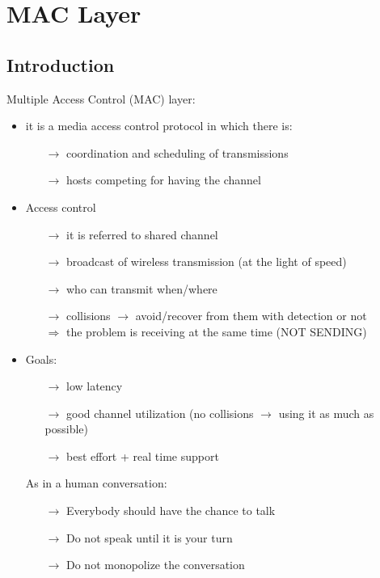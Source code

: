 \section{MAC Layer}

\subsection{Introduction}
Multiple Access Control (MAC) layer:
\begin{itemize}
    \item it is a media access control protocol in which there is:
    \begin{itemize}
        \item[$\rightarrow$] coordination and scheduling of transmissions
        \item[$\rightarrow$] hosts competing for having the channel
    \end{itemize}
    \item Access control
    \begin{itemize}
        \item[$\rightarrow$] it is referred to shared channel
        \item[$\rightarrow$] broadcast of wireless transmission (at the light of speed)
        \item[$\rightarrow$] who can transmit when/where
        \item[$\rightarrow$] collisions $\rightarrow$ avoid/recover from them with detection or not\\
        $\Rightarrow$ the problem is receiving at the same time (NOT SENDING)
    \end{itemize}
    \item Goals:
    \begin{itemize}
        \item[$\rightarrow$] low latency
        \item[$\rightarrow$] good channel utilization (no collisions $\rightarrow$ using it as much as possible)
        \item[$\rightarrow$]  best effort + real time support
    \end{itemize}
    As in a human conversation:
    \begin{itemize}
        \item[$\rightarrow$] Everybody should have the chance to talk
        \item[$\rightarrow$] Do not speak until it is your turn
        \item[$\rightarrow$] Do not monopolize the conversation

\end{itemize}
\end{itemize}
